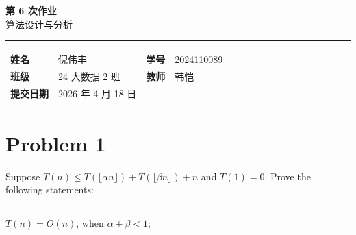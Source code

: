 ﻿\documentclass[12pt,a4paper]{article}
\newcommand{\course}{算法设计与分析}
\newcommand{\homeworktitle}{第 6 次作业}
\newcommand{\studentname}{倪伟丰}
\newcommand{\studentid}{2024110089}
\newcommand{\classname}{24 大数据 2 班}
\newcommand{\teacher}{韩恺}
\newcommand{\duedate}{2026 年 4 月 18 日}
\begin{document}
\begin{center}
  {\Huge\bfseries\color{mainblue}\homeworktitle}\\[0.6em]
  {\Large\course}\\[1.2em]
  {\color{linegray}\rule{0.9\textwidth}{0.8pt}}
\end{center}

\begin{infobox}
\begin{tabularx}{\textwidth}{>{\bfseries}p{2.2cm} X >{\bfseries}p{2.2cm} X}
姓名 & \studentname & 学号 & \studentid \\
班级 & \classname & 教师 & \teacher \\
提交日期 & \duedate &  &  \\
\end{tabularx}
\end{infobox}

\section{Problem 1}

Suppose $T(n) \leq T(\lfloor \alpha n \rfloor) + T(\lfloor \beta n \rfloor) + n$ and $T(1)=0$. Prove the following statements:

\subsection{}

$T(n)=O(n)$, when $\alpha + \beta < 1$;
\end{document}
